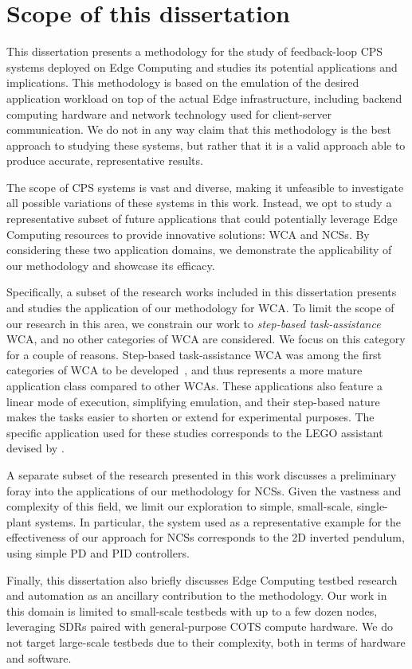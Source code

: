 \section{Scope of this dissertation}

This dissertation presents a methodology for the study of feedback-loop \gls{CPS} systems deployed on Edge Computing and studies its potential applications and implications.
This methodology is based on the emulation of the desired application workload on top of the actual Edge infrastructure, including backend computing hardware and network technology used for client-server communication.
We do not in any way claim that this methodology is the best approach to studying these systems, but rather that it is a valid approach able to produce accurate, representative results.

The scope of \gls{CPS} systems is vast and diverse, making it unfeasible to investigate all possible variations of these systems in this work. 
Instead, we opt to study a representative subset of future applications that could potentially leverage Edge Computing resources to provide innovative solutions: \gls{WCA} and \glspl{NCS}.
By considering these two application domains, we demonstrate the applicability of our methodology and showcase its efficacy.

Specifically, a subset of the research works included in this dissertation presents and studies the application of our methodology for \gls{WCA}.
To limit the scope of our research in this area, we constrain our work to \emph{step-based task-assistance} \gls{WCA}, and no other categories of \gls{WCA} are considered.
We focus on this category for a couple of reasons.
Step-based task-assistance \gls{WCA} was among the first categories of \gls{WCA} to be developed~\cite{chen2015early}, and thus represents a more mature application class compared to other \glspl{WCA}.
These applications also feature a linear mode of execution, simplifying emulation, and their step-based nature makes the tasks easier to shorten or extend for experimental purposes.
The specific application used for these studies corresponds to the LEGO assistant devised by \citeauthor{chen2015early}\cite{chen2015early}.

A separate subset of the research presented in this work discusses a preliminary foray into the applications of our methodology for \glspl{NCS}.
Given the vastness and complexity of this field, we limit our exploration to simple, small-scale, single-plant systems.
In particular, the system used as a representative example for the effectiveness of our approach for \glspl{NCS} corresponds to the \gls{2D} inverted pendulum, using simple \gls{PD} and \gls{PID} controllers.

Finally, this dissertation also briefly discusses Edge Computing testbed research and automation as an ancillary contribution to the methodology.
Our work in this domain is limited to small-scale testbeds with up to a few dozen nodes, leveraging \glspl{SDR} paired with general-purpose \gls{COTS} compute hardware.
We do not target large-scale testbeds due to their complexity, both in terms of hardware and software.